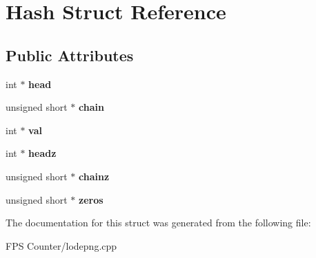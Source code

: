\hypertarget{struct_hash}{}\section{Hash Struct Reference}
\label{struct_hash}
\subsection*{Public Attributes}
\begin{DoxyCompactItemize}
\item 
\mbox{\label{struct_hash_a0977cf12b1d8e6bbc784b5e0877926f5}} 
int $\ast$ {\bfseries head}
\item 
\mbox{\label{struct_hash_abf6ad3db2f652a19cc4ff0792e477899}} 
unsigned short $\ast$ {\bfseries chain}
\item 
\mbox{\label{struct_hash_a66918968854722efdf7ab5f8ac2c6c1d}} 
int $\ast$ {\bfseries val}
\item 
\mbox{\label{struct_hash_a3ed8f51297a858686e11a1a295a3a39c}} 
int $\ast$ {\bfseries headz}
\item 
\mbox{\label{struct_hash_a04ef237e7bc2fa99bc7305fb2352084d}} 
unsigned short $\ast$ {\bfseries chainz}
\item 
\mbox{\label{struct_hash_a7247caa3e23eaba8f0d199ec5010c931}} 
unsigned short $\ast$ {\bfseries zeros}
\end{DoxyCompactItemize}


The documentation for this struct was generated from the following file\+:\begin{DoxyCompactItemize}
\item 
F\+P\+S Counter/lodepng.\+cpp\end{DoxyCompactItemize}
